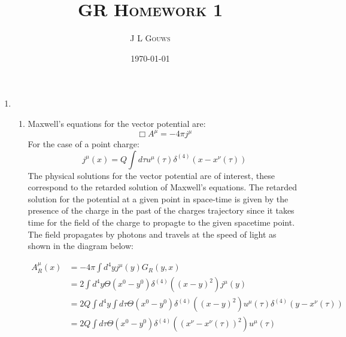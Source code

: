 \documentclass[12pt,a4]{article}
\title{
\textsc{GR Homework 1}
}
\author{\textsc{J L Gouws}
}
\date{\today
\\[1cm]}
\begin{document}
\thispagestyle{empty}

\maketitle

\begin{enumerate}
  \item
    \begin{enumerate}
      \item
        Maxwell's equations for the vector potential are:
        \begin{equation*}
          \Box A^\mu = - 4 \pi j^\mu
        \end{equation*}
        For the case of a point charge:
        \begin{equation*}
          j^\mu(x) = Q \int d\tau u^\mu(\tau) \delta^{(4)} (x - x^{\nu}(\tau))
        \end{equation*}
        The physical solutions for the vector potential are of interest, these correspond to the retarded solution of Maxwell's equations. 
        The retarded solution for the potential at a given point in space-time is given by the presence of the charge in the past of the charges trajectory since it takes time for the field of the charge to propagte to the given spacetime point.
        The field propagates by photons and travels at the speed of light as shown in the diagram below:
        \begin{figure}[H]
          \centering
        \end{figure}
        \begin{align*}
          A^\mu_R(x) &= -4\pi \int d^4 y j^\mu (y) G_R(y,x)\\
                     &= 2 \int d^4 y \Theta(x^{0} - y^{0})\delta^{(4)}\left((x - y)^2\right)j^\mu (y) \\
                     &= 2 Q\int d^4 y \int d\tau \Theta(x^{0} - y^{0})\delta^{(4)}\left((x - y)^2\right)   u^\mu(\tau) \delta^{(4)} (y - x^{\nu}(\tau))\\
                     &= 2 Q \int d\tau \Theta(x^{0} - y^{0})\delta^{(4)}\left((x^\nu - x^{\nu}(\tau))^2\right) u^\mu(\tau)

\end{align*}
\end{enumerate}
\end{enumerate}
\end{document}
